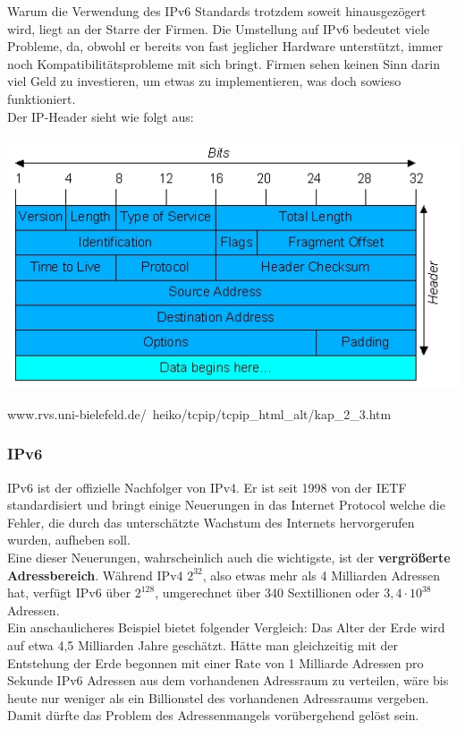 \documentclass[12pt,a4paper]{report}
\begin{document}
\begin{onehalfspace}
Warum die Verwendung des IPv6 Standards trotzdem soweit hinausgezögert wird, liegt an der Starre der Firmen. Die Umstellung auf IPv6 bedeutet viele Probleme, da, obwohl er bereits von fast jeglicher Hardware unterstützt, immer noch Kompatibilitätsprobleme mit sich bringt. Firmen sehen keinen Sinn darin viel Geld zu investieren, um etwas zu implementieren, was doch sowieso funktioniert.\\

Der IP-Header sieht wie folgt aus:\\
\begin{center}
\includegraphics[scale=1]{../docs/tarkes/pics/ipheader.jpg}
\begin{scriptsize}
www.rvs.uni-bielefeld.de/~heiko/tcpip/tcpip\_html\_alt/kap\_2\_3.htm
\end{scriptsize}
\end{center}
\subsubsection{IPv6}
IPv6 ist der offizielle Nachfolger von IPv4. Er ist seit 1998 von der IETF standardisiert und bringt einige Neuerungen in das Internet Protocol welche die Fehler, die durch das unterschätzte Wachstum des Internets hervorgerufen wurden, aufheben soll.\\

Eine dieser Neuerungen, wahrscheinlich auch die wichtigste, ist der \textbf{vergrößerte Adressbereich}. Während IPv4 $2^{32}$, also etwas mehr als 4 Milliarden Adressen hat, verfügt IPv6 über $2^{128}$, umgerechnet über 340 Sextillionen oder $3,4 \cdot 10^{38}$ Adressen.\\
Ein anschaulicheres Beispiel bietet folgender Vergleich: Das Alter der Erde wird auf etwa 4,5 Milliarden Jahre geschätzt. Hätte man gleichzeitig mit der Entstehung der Erde begonnen mit einer Rate von 1 Milliarde Adressen pro Sekunde IPv6 Adressen aus dem vorhandenen Adressraum zu verteilen, wäre bis heute nur weniger als ein Billionstel des vorhandenen Adressraums vergeben.\\
Damit dürfte das Problem des Adressenmangels vorübergehend gelöst sein.\\


\end{onehalfspace}
\end{document}
